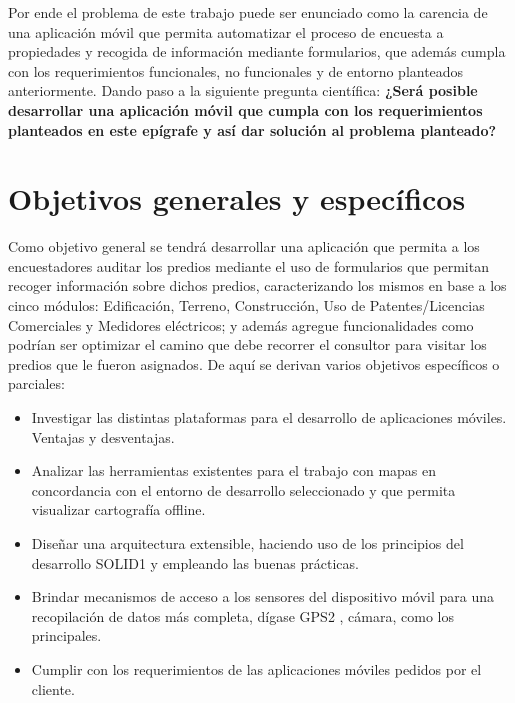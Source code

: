 Por ende el problema de este trabajo puede ser enunciado como la carencia de una
aplicación móvil que permita automatizar el proceso de encuesta a propiedades y
recogida de información mediante formularios, que además cumpla con los
requerimientos funcionales, no funcionales y de entorno planteados anteriormente.
Dando paso a la siguiente pregunta científica:
\textbf{¿Será posible desarrollar una aplicación móvil que cumpla con los requerimientos
      planteados en este epígrafe y así dar solución al problema planteado?}




\section{Objetivos generales y específicos}
Como objetivo general se tendrá desarrollar una aplicación que permita a los
encuestadores auditar los predios mediante el uso de formularios que permitan
recoger información sobre dichos predios, caracterizando los mismos en base a los
cinco módulos: Edificación, Terreno, Construcción, Uso de Patentes/Licencias
Comerciales y Medidores eléctricos; y además agregue funcionalidades como
podrían ser optimizar el camino que debe recorrer el consultor para visitar los
predios que le fueron asignados. De aquí se derivan varios objetivos específicos o
parciales:
\begin{itemize}
      \item Investigar las distintas plataformas para el desarrollo de aplicaciones móviles.
            Ventajas y desventajas.
      \item Analizar las herramientas existentes para el trabajo con mapas en
            concordancia con el entorno de desarrollo seleccionado y que permita
            visualizar cartografía offline.
      \item Diseñar una arquitectura extensible, haciendo uso de los principios del
            desarrollo SOLID1 y empleando las buenas prácticas.
      \item Brindar mecanismos de acceso a los sensores del dispositivo móvil para una
            recopilación de datos más completa, dígase GPS2
            , cámara, como los
            principales.
      \item Cumplir con los requerimientos de las aplicaciones móviles pedidos por el
            cliente.
\end{itemize}

